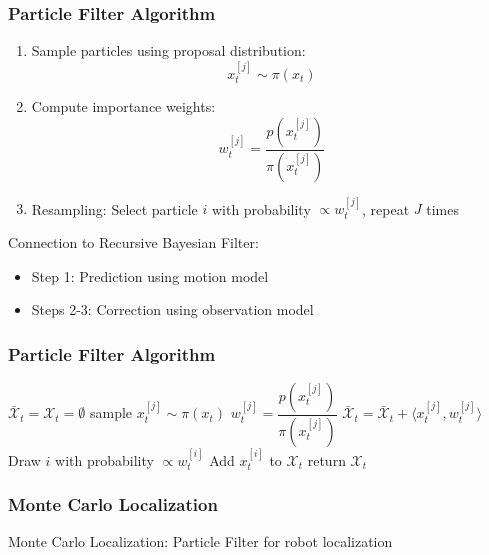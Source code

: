 \begin{frame}
    \frametitle{Particle Filter Algorithm}

    \begin{enumerate}
        \item Sample particles using proposal distribution:
        \begin{equation*}
            x_{t}^{[j]} \sim \pi(x_t) 
        \end{equation*}
        \item Compute importance weights:
        \begin{equation*}
            w_t^{[j]} = \frac{p(x_t^{[j]})}{\pi(x_t^{[j]})}
        \end{equation*}
        \item Resampling: Select particle $i$ with probability $\propto w_t^{[j]}$, repeat $J$ times
    \end{enumerate}

    Connection to Recursive Bayesian Filter:
    \begin{itemize}
        \item Step 1: Prediction using motion model
        \item Steps 2-3: Correction using observation model
    \end{itemize}
\end{frame}

\begin{frame}
    \frametitle{Particle Filter Algorithm}

    \begin{algorithmic}[1]
    \State $\bar{\mathcal{X}}_t = \mathcal{X}_t = \emptyset$
        \State sample $x_t^{[j]} \sim \pi(x_t)$
        \State $w_t^{[j]} = \dfrac{p(x_t^{[j]})}{\pi(x_t^{[j]})}$
        \State $\bar{\mathcal{X}}_t = \bar{\mathcal{X}}_t + \langle x_t^{[j]}, w_t^{[j]}\rangle$
    \EndFor
        \State Draw $i$ with probability $\propto w_t^{[i]}$
        \State Add $x_t^{[i]}$ to $\mathcal{X}_t$
    \EndFor
    \State return $\mathcal{X}_t$
    \EndProcedure
    \end{algorithmic}
\end{frame}

\begin{frame}
    \frametitle{Monte Carlo Localization}

    Monte Carlo Localization: Particle Filter for robot localization
\end{frame}

